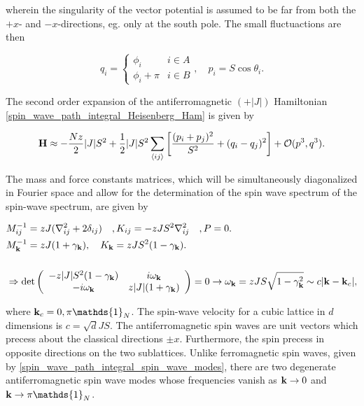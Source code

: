 \documentclass{homework}
\begin{document}
wherein the singularity of the vector potential is assumed to be far from both 
the $+x$- and $-x$-directions, eg. only at the south pole. The small fluctuactions are then 

\begin{equation}
    q_i = \left\{ \begin{array}{cc}
         \phi_i & i \in A\\
         \phi_i + \pi & i \in B
    \end{array} \right., \quad p_i = S \cos \theta_i. 
\end{equation}

The second order expansion of the antiferromagnetic $(+ |J|)$ Hamiltonian \cref{spin_wave_path_integral_Heisenberg_Ham} is given by 

\begin{equation}
    {\bf H} \approx - \frac{Nz}{2} |J| S^2 + \frac{1}{2} |J| S^2 \sum_{ \langle ij \rangle } \bigg[ \frac{(p_i + p_j)^2}{S^2} + (q_i - q_j)^2\bigg] + \mathcal{O}(p^3, q^3).
\end{equation}

The mass and force constants matrices, which will be simultaneously diagonalized in Fourier space and allow for the determination of the spin wave spectrum of the spin-wave spectrum, are given by 

\begin{equation}
\begin{split}
    &M_{ij}^{-1} = z J (\nabla^2_{ij} + 2\delta_{ij}) \quad,  K_{ij} = -z J S^2 \nabla^2_{ij} \quad, P = 0. \\
    &M_{{\bf k}}^{-1} = zJ (1 + \gamma_{{\bf k}}), \quad K_{{\bf k}} = z J S^2 (1- \gamma_{{\bf k}}). \\
    \\
    &\Rightarrow \det \left(\begin{array}{cc}
        -z |J| S^2 (1- \gamma_{{\bf k}}) & i\omega_{{\bf k}}  \\
        -i \omega_{{\bf k}} & z |J| (1 + \gamma_{{\bf k}}) 
    \end{array}\right) = 0 \rightarrow \omega_{{\bf k}} = z J S \sqrt{1-\gamma_{{\bf k}}^2} \sim c |{\bf k} - {\bf k}_c|, 
\end{split}
\end{equation} 

where ${\bf k}_c = 0, \pi \mathds{1}_{N}$. The spin-wave velocity for a cubic lattice in $d$ dimensions is $c = \sqrt{d} JS$. The antiferromagnetic spin waves are unit vectors which precess about the classical directions $\pm x$. Furthermore, the spin precess in opposite directions on the two sublattices. Unlike ferromagnetic spin waves, given by \cref{spin_wave_path_integral_spin_wave_modes}, there are two degenerate antiferromagnetic spin wave modes whose frequencies vanish as ${\bf k} \rightarrow 0$ and ${\bf k} \rightarrow \pi \mathds{1}_N$. \\
\end{document}
